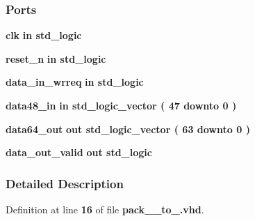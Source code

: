 \subsubsection*{Ports}
 \begin{DoxyCompactItemize}
\item 
{\bf clk}  {\bfseries {\bfseries \textcolor{keywordflow}{in}\textcolor{vhdlchar}{ }}} {\bfseries \textcolor{comment}{std\+\_\+logic}\textcolor{vhdlchar}{ }} 
\item 
{\bf reset\+\_\+n}  {\bfseries {\bfseries \textcolor{keywordflow}{in}\textcolor{vhdlchar}{ }}} {\bfseries \textcolor{comment}{std\+\_\+logic}\textcolor{vhdlchar}{ }} 
\item 
{\bf data\+\_\+in\+\_\+wrreq}  {\bfseries {\bfseries \textcolor{keywordflow}{in}\textcolor{vhdlchar}{ }}} {\bfseries \textcolor{comment}{std\+\_\+logic}\textcolor{vhdlchar}{ }} 
\item 
{\bf data48\+\_\+in}  {\bfseries {\bfseries \textcolor{keywordflow}{in}\textcolor{vhdlchar}{ }}} {\bfseries \textcolor{comment}{std\+\_\+logic\+\_\+vector}\textcolor{vhdlchar}{ }\textcolor{vhdlchar}{(}\textcolor{vhdlchar}{ }\textcolor{vhdlchar}{ } \textcolor{vhdldigit}{47} \textcolor{vhdlchar}{ }\textcolor{keywordflow}{downto}\textcolor{vhdlchar}{ }\textcolor{vhdlchar}{ } \textcolor{vhdldigit}{0} \textcolor{vhdlchar}{ }\textcolor{vhdlchar}{)}\textcolor{vhdlchar}{ }} 
\item 
{\bf data64\+\_\+out}  {\bfseries {\bfseries \textcolor{keywordflow}{out}\textcolor{vhdlchar}{ }}} {\bfseries \textcolor{comment}{std\+\_\+logic\+\_\+vector}\textcolor{vhdlchar}{ }\textcolor{vhdlchar}{(}\textcolor{vhdlchar}{ }\textcolor{vhdlchar}{ } \textcolor{vhdldigit}{63} \textcolor{vhdlchar}{ }\textcolor{keywordflow}{downto}\textcolor{vhdlchar}{ }\textcolor{vhdlchar}{ } \textcolor{vhdldigit}{0} \textcolor{vhdlchar}{ }\textcolor{vhdlchar}{)}\textcolor{vhdlchar}{ }} 
\item 
{\bf data\+\_\+out\+\_\+valid}  {\bfseries {\bfseries \textcolor{keywordflow}{out}\textcolor{vhdlchar}{ }}} {\bfseries \textcolor{comment}{std\+\_\+logic}\textcolor{vhdlchar}{ }} 
\end{DoxyCompactItemize}


\subsubsection{Detailed Description}


Definition at line {\bf 16} of file {\bf pack\+\_\+\_\+to\+\_.\+vhd}.



